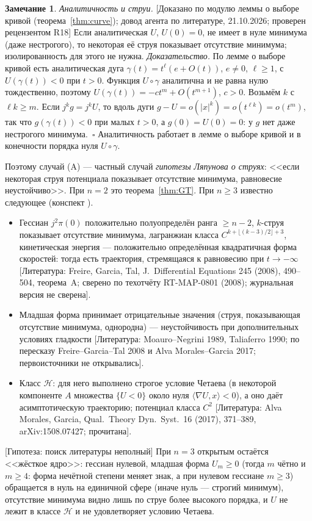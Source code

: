 \documentclass[11pt,a4paper]{article}
\theoremstyle{definition}
\newtheorem{remark}[theorem]{Замечание}
\newcommand{\mk}[1]{\textsf{[#1]}}
\begin{document}
\begin{remark}\label{rem:jet-conj}
\emph{Аналитичность и струи.} \mk{Доказано по модулю леммы о выборе кривой
(теорема~\ref{thm:curve}); довод агента по литературе, 21.10.2026; проверен рецензентом R18} Если аналитическая $U$, $U(0)=0$,
не имеет в нуле минимума (даже нестрогого), то некоторая её струя показывает отсутствие минимума;
изолированность для этого не нужна. \emph{Доказательство.} По лемме о выборе кривой есть
аналитическая дуга $\gamma(t)=t^\ell(e+O(t))$, $e\ne0$, $\ell\ge1$, с $U(\gamma(t))<0$ при $t>0$. Функция
$U\circ\gamma$ аналитична и не равна нулю тождественно, поэтому $U(\gamma(t))=-ct^m+O(t^{m+1})$, $c>0$.
Возьмём $k$ с $\ell k\ge m$. Если $j^kg=j^kU$, то вдоль дуги $g-U=o(|x|^k)=o(t^{\ell k})=o(t^m)$, так что
$g(\gamma(t))<0$ при малых $t>0$, а $g(0)=U(0)=0$: у $g$ нет даже нестрогого минимума.~$\square$
Аналитичность работает в лемме о выборе кривой и в конечности порядка нуля $U\circ\gamma$.

Поэтому случай (A) --- частный случай \emph{гипотезы Ляпунова о струях}: <<если некоторая струя
потенциала показывает отсутствие минимума, равновесие неустойчиво>>. При $n=2$ это
теорема~\ref{thm:GT}. При $n\ge3$ известно следующее (конспект
).
\begin{itemize}[leftmargin=*]
\item Гессиан $j^2\pi(0)$ положительно полуопределён ранга $\ge n-2$, $k$-струя показывает отсутствие
минимума, лагранжиан класса $C^{k+\lfloor(k-3)/2\rfloor+3}$, кинетическая энергия --- положительно
определённая квадратичная форма скоростей: тогда есть траектория, стремящаяся к равновесию при
$t\to-\infty$ \mk{Литература: Freire, Garcia, Tal, J.\ Differential Equations 245 (2008), 490--504,
теорема~A; сверено по техотчёту RT-MAP-0801 (2008); журнальная версия не сверена}.
\item Младшая форма принимает отрицательные значения (струя, показывающая отсутствие минимума,
однородна) --- неустойчивость при дополнительных условиях гладкости \mk{Литература: Moauro--Negrini
1989, Taliaferro 1990; по пересказу Freire--Garcia--Tal 2008 и Alva Morales--Garcia 2017;
первоисточники не открывались}.
\item Класс $\mathcal H$: для него выполнено строгое условие Четаева (в некоторой компоненте $A$
множества $\{U<0\}$ около нуля $\langle\nabla U,x\rangle<0$), а оно даёт асимптотическую траекторию; потенциал
класса $C^2$ \mk{Литература: Alva Morales, Garcia, Qual.\ Theory Dyn.\ Syst.\ 16 (2017), 371--389,
arXiv:1508.07427; прочитана}.
\end{itemize}
\mk{Гипотеза: поиск литературы неполный} При $n=3$ открытым остаётся <<жёсткое ядро>>: гессиан
нулевой, младшая форма $U_m\ge0$ (тогда $m$ чётно и $m\ge4$: форма нечётной степени меняет знак, а
при нулевом гессиане $m\ge3$) обращается в нуль на единичной сфере (иначе нуль --- строгий минимум),
отсутствие минимума видно лишь по струе более высокого порядка, и $U$ не лежит в классе $\mathcal H$
и не удовлетворяет условию Четаева.
\end{remark}
\end{document}
